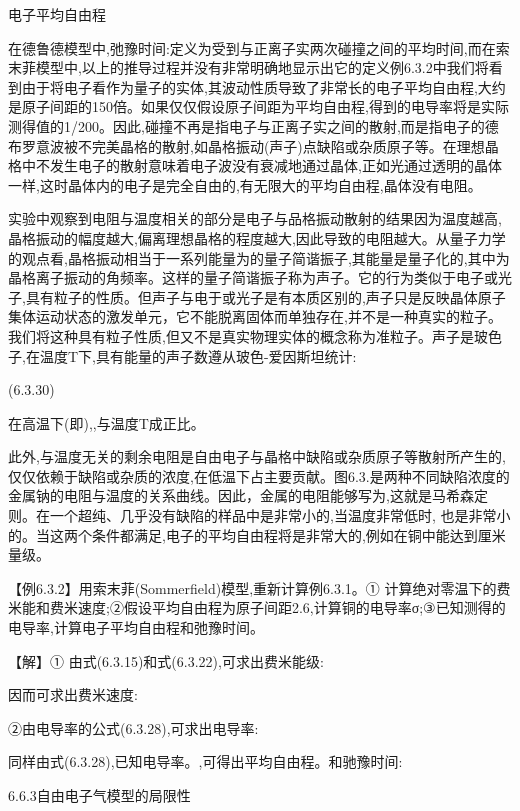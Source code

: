 电子平均自由程

在德鲁德模型中,弛豫时间:定义为受到与正离子实两次碰撞之间的平均时间,而在索末菲模型中,以上的推导过程并没有非常明确地显示出它的定义例6.3.2中我们将看到由于将电子看作为量子的实体,其波动性质导致了非常长的电子平均自由程,大约是原子间距的150倍。如果仅仅假设原子间距为平均自由程,得到的电导率将是实际测得值的1/200。因此,碰撞不再是指电子与正离子实之间的散射,而是指电子的德布罗意波被不完美晶格的散射,如晶格振动(声子)点缺陷或杂质原子等。在理想晶格中不发生电子的散射意味着电子波没有衰减地通过晶体,正如光通过透明的晶体一样,这时晶体内的电子是完全自由的,有无限大的平均自由程,晶体没有电阻。

实验中观察到电阻与温度相关的部分是电子与品格振动散射的结果因为温度越高,晶格振动的幅度越大,偏离理想晶格的程度越大,因此导致的电阻越大。从量子力学的观点看,晶格振动相当于一系列能量为的量子简谐振子,其能量是量子化的,其中为晶格离子振动的角频率。这样的量子简谐振子称为声子。它的行为类似于电子或光子,具有粒子的性质。但声子与电于或光子是有本质区别的,声子只是反映晶体原子集体运动状态的激发单元，它不能脱离固体而单独存在,并不是一种真实的粒子。我们将这种具有粒子性质,但又不是真实物理实体的概念称为准粒子。声子是玻色子,在温度T下,具有能量的声子数遵从玻色-爱因斯坦统计:

 	(6.3.30)

在高温下(即),,与温度T成正比。

此外,与温度无关的剩余电阻是自由电子与晶格中缺陷或杂质原子等散射所产生的,仅仅依赖于缺陷或杂质的浓度,在低温下占主要贡献。图6.3.是两种不同缺陷浓度的金属钠的电阻与温度的关系曲线。因此，金属的电阻能够写为,这就是马希森定则。在一个超纯、几乎没有缺陷的样品中是非常小的,当温度非常低时, 也是非常小的。当这两个条件都满足,电子的平均自由程将是非常大的,例如在铜中能达到厘米量级。



【例6.3.2】用索末菲(Sommerfield)模型,重新计算例6.3.1。① 计算绝对零温下的费米能和费米速度;②假设平均自由程为原子间距2.6,计算铜的电导率σ;③已知测得的电导率,计算电子平均自由程和弛豫时间。

【解】① 由式(6.3.15)和式(6.3.22),可求出费米能级:



因而可求出费米速度:



②由电导率的公式(6.3.28),可求出电导率:



同样由式(6.3.28),已知电导率。,可得出平均自由程。和驰豫时间:



6.6.3自由电子气模型的局限性

